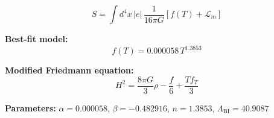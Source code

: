 
\begin{equation}
  S = \int d^4x \, |e| \, \frac{1}{16\pi G} \left[ f(T) + \mathcal{L}_m \right]
\end{equation}

\textbf{Best-fit model:}
\begin{equation}
  f(T) = 0.000058 \, T^{1.3853}
\end{equation}

\textbf{Modified Friedmann equation:}
\begin{equation}
  H^2 = \frac{8\pi G}{3} \rho - \frac{f}{6} + \frac{T f_T}{3}
\end{equation}

\textbf{Parameters:}
$\alpha = 0.000058$, \quad
$\beta = -0.482916$, \quad
$n = 1.3853$, \quad
$\Lambda_{\text{BI}} = 40.9087$